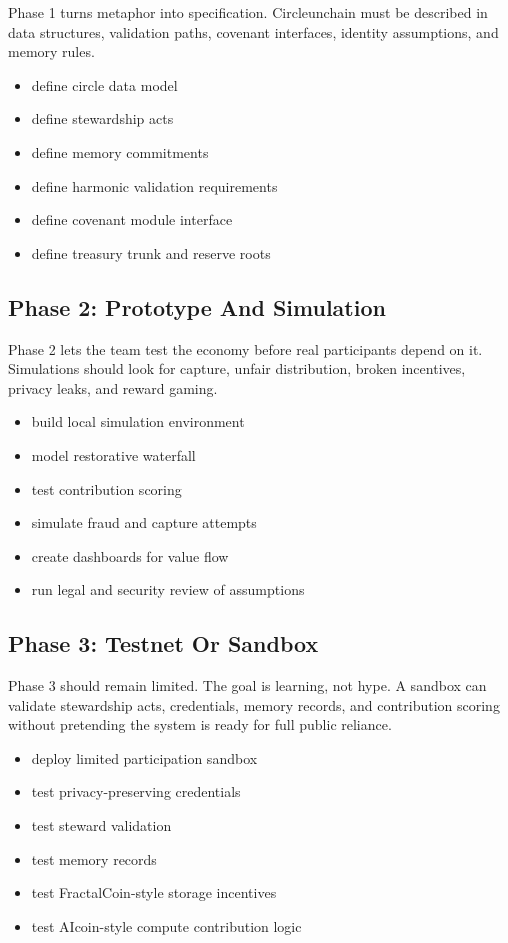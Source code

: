 \documentclass[12pt]{article}
\begin{document}
Phase 1 turns metaphor into specification. Circleunchain must be described in data structures, validation paths, covenant interfaces, identity assumptions, and memory rules.

\begin{itemize}
  \item define circle data model
  \item define stewardship acts
  \item define memory commitments
  \item define harmonic validation requirements
  \item define covenant module interface
  \item define treasury trunk and reserve roots
\end{itemize}

\subsection{Phase 2: Prototype And Simulation}

Phase 2 lets the team test the economy before real participants depend on it. Simulations should look for capture, unfair distribution, broken incentives, privacy leaks, and reward gaming.

\begin{itemize}
  \item build local simulation environment
  \item model restorative waterfall
  \item test contribution scoring
  \item simulate fraud and capture attempts
  \item create dashboards for value flow
  \item run legal and security review of assumptions
\end{itemize}

\subsection{Phase 3: Testnet Or Sandbox}

Phase 3 should remain limited. The goal is learning, not hype. A sandbox can validate stewardship acts, credentials, memory records, and contribution scoring without pretending the system is ready for full public reliance.

\begin{itemize}
  \item deploy limited participation sandbox
  \item test privacy-preserving credentials
  \item test steward validation
  \item test memory records
  \item test FractalCoin-style storage incentives
  \item test AIcoin-style compute contribution logic
\end{itemize}
\end{document}
